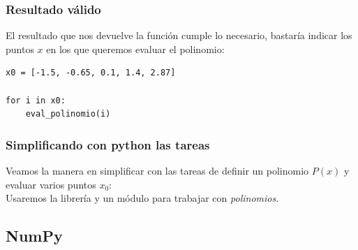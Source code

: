 \documentclass[12pt]{beamer}
\begin{document}
\begin{frame}[fragile]
\frametitle{Resultado válido}
El resultado que nos devuelve la función cumple lo necesario, bastaría indicar los puntos $x$ en los que queremos evaluar el polinomio:
\pause
\begin{lstlisting}[caption=Evaluando los puntos]
x0 = [-1.5, -0.65, 0.1, 1.4, 2.87]

for i in x0:
    eval_polinomio(i)
\end{lstlisting}
\end{frame}
\begin{frame}
\frametitle{Simplificando con python las tareas}
Veamos la manera en simplificar con \python{} las tareas de definir un polinomio $P (x)$ y evaluar varios puntos $x_{0}$:
\\
\bigskip
\pause
Usaremos la librería  y un módulo para trabajar con \emph{polinomios}.
\end{frame}

\subsection{NumPy}
\end{document}

